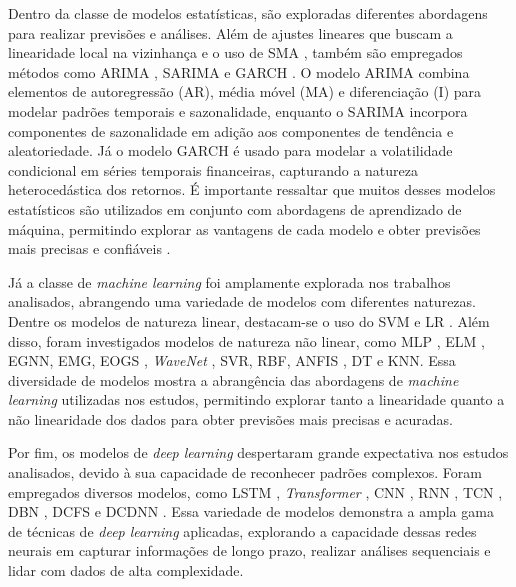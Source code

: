 Dentro da classe de modelos estatísticas, são exploradas diferentes abordagens para realizar previsões e análises. Além de ajustes lineares que buscam a linearidade local na vizinhança \cite{Charlene} e o uso de \ac{SMA} \cite{Ciniro_Econometric}, também são empregados métodos como \ac{ARIMA} \cite{Leonardo_Comparative, gao2021stock}, \ac{SARIMA} e \ac{GARCH} \cite{Ciniro_Econometric}. O modelo \ac{ARIMA} combina elementos de autoregressão (AR), média móvel (MA) e diferenciação (I) para modelar padrões temporais e sazonalidade, enquanto o \ac{SARIMA} incorpora componentes de sazonalidade em adição aos componentes de tendência e aleatoriedade. Já o modelo \ac{GARCH} é usado para modelar a volatilidade condicional em séries temporais financeiras, capturando a natureza heterocedástica dos retornos. É importante ressaltar que muitos desses modelos estatísticos são utilizados em conjunto com abordagens de aprendizado de máquina, permitindo explorar as vantagens de cada modelo e obter previsões mais precisas e confiáveis \cite{Ciniro_Econometric}.

Já a classe de \textit{machine learning} foi amplamente explorada nos trabalhos analisados, abrangendo uma variedade de modelos com diferentes naturezas. Dentre os modelos de natureza linear, destacam-se o uso do \ac{SVM} \cite{altan2019effect, Anand_Comparison} e \ac{LR} \cite{pabucccu2023forecasting}. Além disso, foram investigados modelos de natureza não linear, como \ac{MLP} \cite{Jerzy_Deep, Faramarz_Integrating}, \ac{ELM} \cite{Manrui_two-stage}, \ac{EGNN}, \ac{EMG}, \ac{EOGS} \cite{Vinícius_Sistemas}, \textit{WaveNet} \cite{Leonardo_Comparative}, \ac{SVR}, \ac{RBF}, \ac{ANFIS} \cite{Faramarz_Integrating}, \ac{DT} e \ac{KNN}\cite{halil2019predicting}. Essa diversidade de modelos mostra a abrangência das abordagens de \textit{machine learning} utilizadas nos estudos, permitindo explorar tanto a linearidade quanto a não linearidade dos dados para obter previsões mais precisas e acuradas.

Por fim, os modelos de \textit{deep learning} despertaram grande expectativa nos estudos analisados, devido à sua capacidade de reconhecer padrões complexos. Foram empregados diversos modelos, como \ac{LSTM} \cite{anwar2019forecasting, Xiaoci_Predicting, Jian_Forecasting, gao2021stock,  lee2021exploring, Firat}, \textit{Transformer} \cite{Chaojie_Stock}, \ac{CNN} \cite{Anand_Comparison}, \ac{RNN} \cite{Xiaoci_Predicting, gao2021stock, Anand_Comparison, Firat}, \ac{TCN} \cite{Firat}, \ac{DBN} \cite{Xiaoci_Predicting}, \ac{DCFS} \cite{Li-Xin_Fast} e \ac{DCDNN} \cite{Jian_Forecasting}. Essa variedade de modelos demonstra a ampla gama de técnicas de \textit{deep learning} aplicadas, explorando a capacidade dessas redes neurais em capturar informações de longo prazo, realizar análises sequenciais e lidar com dados de alta complexidade. 

